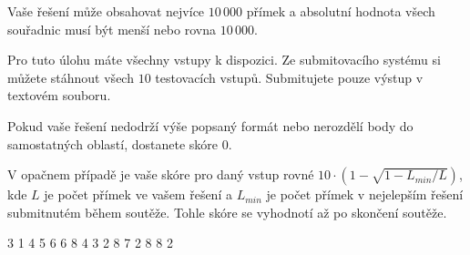 Vaše řešení může obsahovat nejvíce $10\,000$ přímek a absolutní hodnota všech souřadnic musí být menší nebo rovna $10\,000$.


Pro tuto úlohu máte všechny vstupy k dispozici. Ze submitovacího systému si můžete stáhnout všech $10$ testovacích vstupů. Submitujete pouze výstup v textovém souboru.

Pokud vaše řešení nedodrží výše popsaný formát nebo nerozdělí body do samostatných oblastí, dostanete skóre $0$.

V opačnem případě je vaše skóre pro daný vstup rovné
$ 10 \cdot \left(1 - \sqrt{1 - L_{min} / L}\right)$,
kde $L$ je počet přímek ve vašem řešení a $L_{min}$ je počet přímek v nejelepším řešení submitnutém během soutěže.
Tohle skóre se vyhodnotí až po skončení soutěže.


3 1
4 5
6 6
8 4
3 2 8 7
2 8 8 2
\sampleEND


